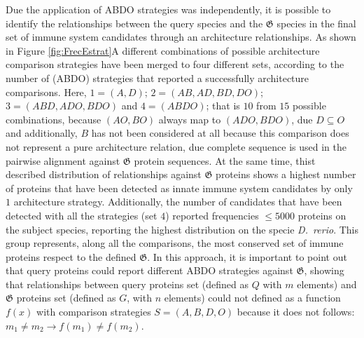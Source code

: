 \documentclass[11pt]{article}
\begin{document}
Due the application of ABDO strategies was independently, it is possible to 
identify the relationships between the query species and the 
$\boldsymbol{\mathfrak{G}}$ species in the final set of immune system 
candidates through an architecture relationships. As shown in Figure 
\ref{fig:FrecEstrat}A different combinations of possible architecture 
comparison strategies have been merged to four different sets, according to the 
number of (ABDO) strategies that reported a successfully architecture 
comparisons. Here, $1 = (A, D)$; $2 = (AB, AD, BD, DO)$; $3 = (ABD, ADO, BDO)$ 
and $4 = (ABDO)$; that is $10$ from $15$ possible combinations, because $(AO, 
BO)$ always map to $(ADO, BDO)$, due $D \subseteq O$ and additionally, $B$ has 
not been considered at all because this comparison does not represent a pure 
architecture relation, due complete sequence is used in the pairwise alignment 
against $\boldsymbol{\mathfrak{G}}$ protein sequences. At the same time, 
thist described distribution of relationships against 
$\boldsymbol{\mathfrak{G}}$ proteins shows a highest number of proteins that 
have been detected as innate immune system candidates by only $1$ architecture 
strategy. Additionally, the number of candidates that have been detected with 
all the strategies (set $4$) reported frequencies $\leq 5000$ proteins on the 
subject species, reporting the highest distribution on the specie \textit{D.\ 
rerio}. This group represents, along all the comparisons, the most conserved 
set of immune proteins respect to the defined $\boldsymbol{\mathfrak{G}}$. In 
this approach, it is important to point out that query proteins could report 
different ABDO strategies against $\boldsymbol{\mathfrak{G}}$, showing that 
relationships between query proteins set (defined as $Q$ with $m$ elements) and 
$\boldsymbol{\mathfrak{G}}$ proteins set (defined as $G$, with $n$ elements) 
could not defined as a function $f(x)$ with comparison strategies $S= (A, B, D, 
O)$ because it does not follows: $m_1 \ne m_2 \rightarrow f(m_1) \ne f(m_2)$.
\end{document}
